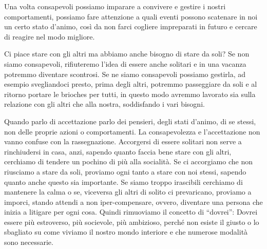 \documentclass[12pt]{book} %
\begin{document}
Una volta consapevoli possiamo imparare a convivere e gestire i nostri comportamenti, possiamo fare attenzione a quali
eventi possono scatenare in noi un certo stato d'animo, così da non farci cogliere impreparati in
futuro e cercare di reagire nel modo migliore. 

Ci piace stare con gli altri ma abbiamo anche bisogno di stare da soli? Se non siamo consapevoli, rifiuteremo
l'idea di essere anche solitari e in una vacanza potremmo diventare scontrosi. Se ne siamo
consapevoli possiamo gestirla, ad esempio svegliandoci presto, prima degli altri, potremmo passeggiare da soli e al
ritorno portare le brioches per tutti, in questo modo avremmo lavorato sia sulla relazione con gli altri che alla
nostra, soddisfando i vari bisogni.

Quando parlo di accettazione parlo dei pensieri, degli stati d'animo, di se stessi, non delle
proprie azioni o comportamenti. La consapevolezza e l'accettazione non vanno confuse con la
rassegnazione. Accorgersi di essere solitari non serve a rinchiudersi in casa, anzi, sapendo quanto faccia bene stare
con gli altri, cerchiamo di tendere un pochino di più alla socialità. Se ci accorgiamo che non riusciamo a stare da
soli, proviamo ogni tanto a stare con noi stessi, sapendo quanto anche questo sia importante. Se siamo troppo irascibili cerchiamo di mantenere la calma o se, viceversa gli altri di solito ci prevaricano, proviamo a imporci, stando attendi a non iper-compensare, ovvero, diventare una persona che inizia a litigare per ogni cosa. Quindi rimuoviamo il concetto
di “dovrei”: Dovrei essere più estroverso, più socievole, più ambizioso, perché non esiste il giusto o lo sbagliato su
come viviamo il nostro mondo interiore e che numerose modalità sono necessarie.
\end{document}
